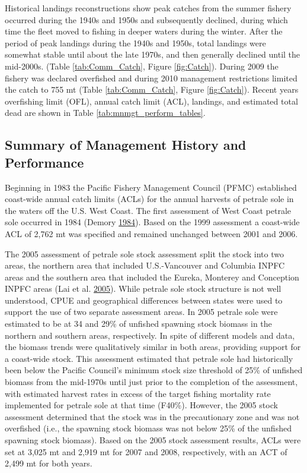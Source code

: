 \documentclass[12pt,]{article}
\begin{document}
Historical landings reconstructions show peak catches from the summer
fishery occurred during the 1940s and 1950s and subsequently declined,
during which time the fleet moved to fishing in deeper waters during the
winter. After the period of peak landings during the 1940s and 1950s,
total landings were somewhat stable until about the late 1970s, and then
generally declined until the mid-2000s. (Table \ref{tab:Comm_Catch},
Figure \ref{fig:Catch}). During 2009 the fishery was declared overfished
and during 2010 management restrictions limited the catch to 755 mt
(Table \ref{tab:Comm_Catch}, Figure \ref{fig:Catch}). Recent years
overfishing limit (OFL), annual catch limit (ACL), landings, and
estimated total dead are shown in Table \ref{tab:mnmgt_perform_tables}.

\subsection{Summary of Management History and
Performance}\label{summary-of-management-history-and-performance}

Beginning in 1983 the Pacific Fishery Management Council (PFMC)
established coast-wide annual catch limits (ACLs) for the annual
harvests of petrale sole in the waters off the U.S. West Coast. The
first assessment of West Coast petrale sole occurred in 1984 (Demory
\protect\hyperlink{ref-demory_progress_1984}{1984}). Based on the 1999
assessment a coast-wide ACL of 2,762 mt was specified and remained
unchanged between 2001 and 2006.

The 2005 assessment of petrale sole stock assessment split the stock
into two areas, the northern area that included U.S.-Vancouver and
Columbia INPFC areas and the southern area that included the Eureka,
Monterey and Conception INPFC areas (Lai et al.
\protect\hyperlink{ref-lai_stock_2005}{2005}). While petrale sole stock
structure is not well understood, CPUE and geographical differences
between states were used to support the use of two separate assessment
areas. In 2005 petrale sole were estimated to be at 34 and 29\% of
unfished spawning stock biomass in the northern and southern areas,
respectively. In spite of different models and data, the biomass trends
were qualitatively similar in both areas, providing support for a
coast-wide stock. This assessment estimated that petrale sole had
historically been below the Pacific Council's minimum stock size
threshold of 25\% of unfished biomass from the mid-1970s until just
prior to the completion of the assessment, with estimated harvest rates
in excess of the target fishing mortality rate implemented for petrale
sole at that time (F40\%). However, the 2005 stock assessment determined
that the stock was in the precautionary zone and was not overfished
(i.e., the spawning stock biomass was not below 25\% of the unfished
spawning stock biomass). Based on the 2005 stock assessment results,
ACLs were set at 3,025 mt and 2,919 mt for 2007 and 2008, respectively,
with an ACT of 2,499 mt for both years.
\end{document}
